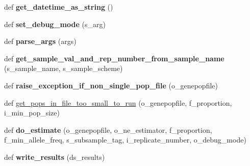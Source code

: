 \begin{DoxyCompactItemize}
\item 
def {\bfseries get\+\_\+datetime\+\_\+as\+\_\+string} ()\hypertarget{namespacenegui_1_1pgdriveneestimator_a2d64d88a4d4f63a1f8e0c71606942690}{}\label{namespacenegui_1_1pgdriveneestimator_a2d64d88a4d4f63a1f8e0c71606942690}

\item 
def {\bfseries set\+\_\+debug\+\_\+mode} (s\+\_\+arg)\hypertarget{namespacenegui_1_1pgdriveneestimator_aa1b949a1baced8ac2725ae493f7216d8}{}\label{namespacenegui_1_1pgdriveneestimator_aa1b949a1baced8ac2725ae493f7216d8}

\item 
def {\bfseries parse\+\_\+args} (args)\hypertarget{namespacenegui_1_1pgdriveneestimator_a3a0c075de2bc7a0d00b1893128b189c8}{}\label{namespacenegui_1_1pgdriveneestimator_a3a0c075de2bc7a0d00b1893128b189c8}

\item 
def {\bfseries get\+\_\+sample\+\_\+val\+\_\+and\+\_\+rep\+\_\+number\+\_\+from\+\_\+sample\+\_\+name} (s\+\_\+sample\+\_\+name, s\+\_\+sample\+\_\+scheme)\hypertarget{namespacenegui_1_1pgdriveneestimator_a3807e058c5f9e9e73eb6ecae5221853b}{}\label{namespacenegui_1_1pgdriveneestimator_a3807e058c5f9e9e73eb6ecae5221853b}

\item 
def {\bfseries raise\+\_\+exception\+\_\+if\+\_\+non\+\_\+single\+\_\+pop\+\_\+file} (o\+\_\+genepopfile)\hypertarget{namespacenegui_1_1pgdriveneestimator_ac98833013f11d6aa3544b0fc60951632}{}\label{namespacenegui_1_1pgdriveneestimator_ac98833013f11d6aa3544b0fc60951632}

\item 
def \hyperlink{namespacenegui_1_1pgdriveneestimator_a8255cfe046e2bbb517ee9834d626c021}{get\+\_\+pops\+\_\+in\+\_\+file\+\_\+too\+\_\+small\+\_\+to\+\_\+run} (o\+\_\+genepopfile, f\+\_\+proportion, i\+\_\+min\+\_\+pop\+\_\+size)
\item 
def {\bfseries do\+\_\+estimate} (o\+\_\+genepopfile, o\+\_\+ne\+\_\+estimator, f\+\_\+proportion, f\+\_\+min\+\_\+allele\+\_\+freq, s\+\_\+subsample\+\_\+tag, i\+\_\+replicate\+\_\+number, o\+\_\+debug\+\_\+mode)\hypertarget{namespacenegui_1_1pgdriveneestimator_ade876f515c78ffc10778e5b5367db785}{}\label{namespacenegui_1_1pgdriveneestimator_ade876f515c78ffc10778e5b5367db785}

\item 
def {\bfseries write\+\_\+results} (ds\+\_\+results)\hypertarget{namespacenegui_1_1pgdriveneestimator_a1944bfa9f99fd76c5cd0e82be5fe0e4f}{}\label{namespacenegui_1_1pgdriveneestimator_a1944bfa9f99fd76c5cd0e82be5fe0e4f}


\end{DoxyCompactItemize}
